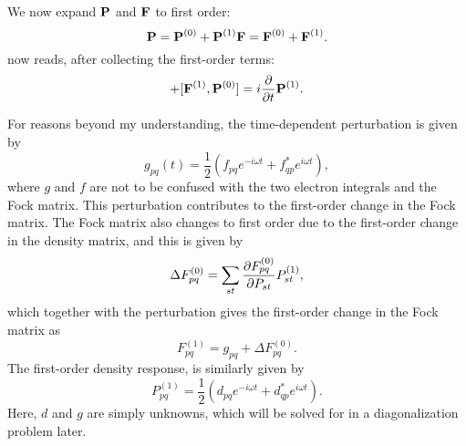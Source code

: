 \documentclass{article}
\begin{document}
We now expand $\bm{\mathrm{P}}$ and $\bm{\mathrm{F}}$ to first order:
\begin{equation}
    \bm{\mathrm{P}}=\bm{\mathrm{P}}^{(0)}+\bm{\mathrm{P}}^{(1)}\\
    \bm{\mathrm{F}}=\bm{\mathrm{F}}^{(0)}+\bm{\mathrm{F}}^{(1)}.
\end{equation}
 now reads, after collecting the first-order terms:
\begin{equation}
    [\bvec{F}^{(0)},\bvec{P}^{(1)}]+[\bvec{F}^{(1)},\bvec{P}^{(0)}]=i\diffp{}{t}\bvec{P}^{(1)}.
\end{equation}

For reasons beyond my understanding, the time-dependent perturbation is given by
\begin{equation}
    g_{pq}(t)=\frac{1}{2}(f_{pq}e^{-i\omega t}+f_{qp}^*e^{i\omega t}),
\end{equation}
where $g$ and $f$ are not to be confused with the two electron integrals and the Fock matrix. This perturbation contributes to the first-order change in the Fock matrix. The Fock matrix also changes to first order due to the first-order change in the density matrix, and this is given by
\begin{equation}
\Delta F_{pq}^{(0)}=\sum_{st}\diffp{F_{pq}^{(0)}}{P_{st}}P_{st}^{(1)},
\end{equation}
which together with the perturbation gives the first-order change in the Fock matrix as 
\begin{equation}
    F^{(1)}_{pq}=g_{pq}+\Delta F_{pq}^{(0)}.
\end{equation}
The first-order density response, is similarly given by
\begin{equation}
    P_{pq}^{(1)}=\frac{1}{2}(d_{pq}e^{-i\omega t}+d_{qp}^*e^{i\omega t}).
\end{equation}
Here, $d$ and $g$ are simply unknowns, which will be solved for in a diagonalization problem later.
\end{document}
